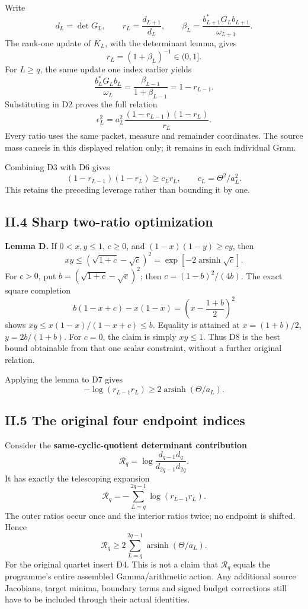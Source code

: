 Write \[
d_L=\det G_L,\qquad
r_L=\frac{d_{L+1}}{d_L},\qquad
\beta_L=\frac{b_{L+1}^*G_Lb_{L+1}}{\omega_{L+1}}.
\] The rank-one update of \(K_L\), with the determinant lemma, gives \[
\boxed{r_L=(1+\beta_L)^{-1}\in(0,1].}
\tag{D5}
\] For \(L\ge q\), the same update one index earlier yields \[
\frac{b_L^*G_Lb_L}{\omega_L}
=\frac{\beta_{L-1}}{1+\beta_{L-1}}=1-r_{L-1}.
\] Substituting in D2 proves the full relation \[
\boxed{
\epsilon_L^2
=a_L^2\frac{(1-r_{L-1})(1-r_L)}{r_L}.
}
\tag{D6}
\] Every ratio uses the same packet, measure and remainder coordinates.
The source mass cancels in this displayed relation only; it remains in
each individual Gram.

Combining D3 with D6 gives \[
(1-r_{L-1})(1-r_L)\ge c_Lr_L,
\qquad c_L=\Theta^2/a_L^2.
\tag{D7}
\] This retains the preceding leverage rather than bounding it by one.

\subsection{II.4 Sharp two-ratio
optimization}\label{ii.4-sharp-two-ratio-optimization}

\textbf{Lemma D.} If \(0<x,y\le1\), \(c\ge0\), and \((1-x)(1-y)\ge cy\),
then \[
\boxed{xy\le(\sqrt{1+c}-\sqrt c)^2
=\exp[-2\operatorname{arsinh}\sqrt c].}
\tag{D8}
\] For \(c>0\), put \(b=(\sqrt{1+c}-\sqrt c)^2\); then
\(c=(1-b)^2/(4b)\). The exact square completion \[
b(1-x+c)-x(1-x)=\left(x-\frac{1+b}{2}\right)^2
\] shows \(xy\le x(1-x)/(1-x+c)\le b\). Equality is attained at
\(x=(1+b)/2\), \(y=2b/(1+b)\). For \(c=0\), the claim is simply
\(xy\le1\). Thus D8 is the best bound obtainable from that one scalar
constraint, without a further original relation.

Applying the lemma to D7 gives \[
\boxed{
-\log(r_{L-1}r_L)\ge
2\operatorname{arsinh}(\Theta/a_L).
}
\tag{D9}
\]

\subsection{II.5 The original four endpoint
indices}\label{ii.5-the-original-four-endpoint-indices}

Consider the \textbf{same-cyclic-quotient determinant contribution} \[
\mathcal R_q
=\log\frac{d_{q-1}d_q}{d_{2q-1}d_{2q}}.
\] It has exactly the telescoping expansion \[
\mathcal R_q=-\sum_{L=q}^{2q-1}\log(r_{L-1}r_L).
\] The outer ratios occur once and the interior ratios twice; no
endpoint is shifted. Hence \[
\boxed{
\mathcal R_q\ge
2\sum_{L=q}^{2q-1}\operatorname{arsinh}(\Theta/a_L).
}
\tag{D10}
\] For the original quartet insert D4. This is not a claim that
\(\mathcal R_q\) equals the programme's entire assembled
Gamma/arithmetic action. Any additional source Jacobians, target minima,
boundary terms and signed budget corrections still have to be included
through their actual identities.

